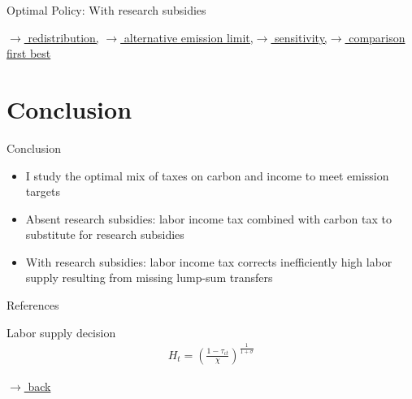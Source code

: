 \documentclass[11pt,aspectratio=169]{beamer}
\begin{document}
\begin{frame}{Optimal Policy: With research subsidies}
\hypertarget{backOPT}{}
\vspace{-4mm}
\hfill

\hyperlink{Redis}{\tiny{$\rightarrow$ redistribution,}}
\hyperlink{altems}{\tiny{$\rightarrow$ alternative emission limit,}}\hyperlink{sensphi}{\tiny{$\rightarrow$ sensitivity,}}\hyperlink{compfb}{\tiny{$\rightarrow$ comparison first best}}
\end{frame}

\hypertarget{conc}{}
\section{Conclusion}
\begin{frame}{Conclusion}
\begin{itemize}[<+-| alert@+>]
	\item I study the optimal mix of taxes on carbon and income to meet emission targets
	\vspace{3mm}
	
	\item Absent research subsidies: labor income tax combined with carbon tax to substitute for research subsidies
	\item With research subsidies: labor income tax corrects inefficiently high labor supply resulting from missing lump-sum transfers
\end{itemize}
\end{frame}
\begin{frame}[shrink]{References}



\end{frame}



\appendix

\begin{frame}{Labor supply decision}
\hypertarget{labsup}{}
\begin{align*}
	H_t=\left(\frac{1-\tau_{\iota t}}{\chi}\right)^{\frac{1}{1+\sigma}}
\end{align*}

\vfill
\vspace{0mm}
\hfill 
\hyperlink{hhopt}{\tiny{$\rightarrow$ back}}
\end{frame}
\end{document}
